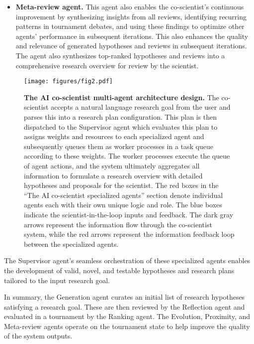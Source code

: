 \begin{itemize}
    \item \textbf{Meta-review agent.} This agent also enables the co-scientist's continuous improvement by synthesizing insights from all reviews, identifying recurring patterns in tournament debates, and using these findings to optimize other agents' performance in subsequent iterations. This also enhances the quality and relevance of generated hypotheses and reviews in subsequent iterations. The agent also synthesizes top-ranked hypotheses and reviews into a comprehensive research overview for review by the scientist.
\end{itemize}

\begin{figure}[htbp!]
\centering
\texttt{[image: figures/fig2.pdf]}
\vspace{0.1cm}
\caption{\textbf{The AI co-scientist multi-agent architecture design.} The co-scientist accepts a natural language research goal from the user and parses this into a research plan configuration. This plan is then dispatched to the Supervisor agent which evaluates this plan to assigns weights and resources to each specialized agent and subsequently queues them as worker processes in a task queue according to these weights. The worker processes execute the queue of agent actions, and the system ultimately aggregates all information to formulate a research overview with detailed hypotheses and proposals for the scientist. The red boxes in the ``The AI co-scientist specialized agents'' section denote individual agents each with their own unique logic and role. The blue boxes indicate the scientist-in-the-loop inputs and feedback. The dark gray arrows represent the information flow through the co-scientist system, while the red arrows represent the information feedback loop between the specialized agents.}
\label{fig:workflow}
\end{figure}

The Supervisor agent's seamless orchestration of these specialized agents enables the development of valid, novel, and testable hypotheses and research plans tailored to the input research goal.

In summary, the Generation agent curates an initial list of research hypotheses satisfying a research goal. These are then reviewed by the Reflection agent and evaluated in a tournament by the Ranking agent. The Evolution, Proximity, and Meta-review agents operate on the tournament state to help improve the quality of the system outputs.


